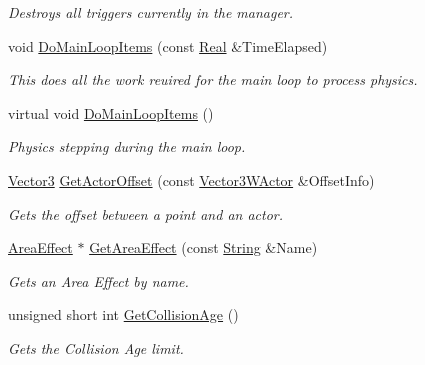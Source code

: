 \begin{DoxyCompactItemize}
\begin{DoxyCompactList}\small\item\em Destroys all triggers currently in the manager. \item\end{DoxyCompactList}\item 
void \hyperlink{classphys_1_1PhysicsManager_ad363d6683a0276395eeb2c42a56f95fc}{DoMainLoopItems} (const \hyperlink{namespacephys_af7eb897198d265b8e868f45240230d5f}{Real} \&TimeElapsed)
\begin{DoxyCompactList}\small\item\em This does all the work reuired for the main loop to process physics. \item\end{DoxyCompactList}\item 
virtual void \hyperlink{classphys_1_1PhysicsManager_a62741a2582ac9bfd0255cf8a3ad2310c}{DoMainLoopItems} ()
\begin{DoxyCompactList}\small\item\em Physics stepping during the main loop. \item\end{DoxyCompactList}\item 
\hyperlink{classphys_1_1Vector3}{Vector3} \hyperlink{classphys_1_1PhysicsManager_a54a48fdfd9db914c25a0f892c2f56301}{GetActorOffset} (const \hyperlink{classphys_1_1Vector3WActor}{Vector3WActor} \&OffsetInfo)
\begin{DoxyCompactList}\small\item\em Gets the offset between a point and an actor. \item\end{DoxyCompactList}\item 
\hyperlink{classphys_1_1AreaEffect}{AreaEffect} $\ast$ \hyperlink{classphys_1_1PhysicsManager_a458b0649bee606aa6dd2d724135f1871}{GetAreaEffect} (const \hyperlink{namespacephys_aa03900411993de7fbfec4789bc1d392e}{String} \&Name)
\begin{DoxyCompactList}\small\item\em Gets an Area Effect by name. \item\end{DoxyCompactList}\item 
unsigned short int \hyperlink{classphys_1_1PhysicsManager_a4232e8cd52e70b623ef30c40be6cdb4a}{GetCollisionAge} ()
\begin{DoxyCompactList}\small\item\em Gets the Collision Age limit. \item\end{DoxyCompactList}\item 

\end{DoxyCompactItemize}
